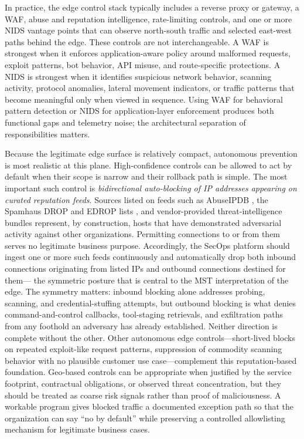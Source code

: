 \documentclass[unnumsec,webpdf,contemporary,large]{oup-authoring-template}
\theoremstyle{thmstyleone}
\theoremstyle{thmstyletwo}
\theoremstyle{thmstylethree}
\begin{document}
In practice, the edge control stack typically includes a reverse proxy or gateway, a WAF,
abuse and reputation intelligence, rate-limiting controls, and one or more NIDS vantage
points that can observe north-south traffic and selected east-west paths behind the edge.
These controls are not interchangeable. A WAF is strongest when it enforces
application-aware policy around malformed requests, exploit patterns, bot behavior,
API misuse, and route-specific protections. A NIDS is strongest when it identifies
suspicious network behavior, scanning activity, protocol anomalies, lateral movement
indicators, or traffic patterns that become meaningful only when viewed in sequence.
Using WAF for behavioral pattern detection or NIDS for application-layer enforcement
produces both functional gaps and telemetry noise; the architectural separation of
responsibilities matters.

Because the legitimate edge surface is relatively compact, autonomous prevention is most
realistic at this plane. High-confidence controls can be allowed to act by default when
their scope is narrow and their rollback path is simple. The most important such control is \textit{bidirectional auto-blocking of IP addresses appearing on curated reputation feeds}.
Sources listed on feeds such as AbuseIPDB \cite{abuseipdb2024}, the Spamhaus DROP and EDROP lists \cite{spamhaus2024}, and
vendor-provided threat-intelligence bundles represent, by construction, hosts that have
demonstrated adversarial activity against other organizations. Permitting connections
to or from them serves no legitimate business purpose. Accordingly, the SecOps platform
should ingest one or more such feeds continuously and automatically drop both inbound
connections originating from listed IPs and outbound connections destined for them---
the symmetric posture that is central to the MST interpretation of the edge.
The symmetry matters: inbound blocking alone addresses probing, scanning, and
credential-stuffing attempts, but outbound blocking is what denies command-and-control
callbacks, tool-staging retrievals, and exfiltration paths from any foothold an
adversary has already established. Neither direction is complete without the other.
Other autonomous edge controls---short-lived blocks on repeated exploit-like request patterns,
suppression of commodity scanning behavior with no plausible customer use case---complement
this reputation-based foundation. Geo-based controls
can be appropriate when justified by the service footprint, contractual obligations, or
observed threat concentration, but they should be treated as coarse risk signals rather
than proof of maliciousness. A workable program gives blocked traffic a documented
exception path so that the organization can say ``no by default'' while preserving a
controlled allowlisting mechanism for legitimate business cases.
\end{document}
